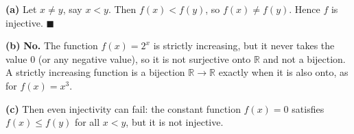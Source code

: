 \textbf{(a)} Let $x\ne y$, say $x<y$. Then $f(x)<f(y)$, so $f(x)\ne f(y)$. Hence $f$ is injective. $\blacksquare$

\textbf{(b)} \textbf{No.} The function $f(x)=2^x$ is strictly increasing, but it never takes the value $0$ (or any negative value), so it is not surjective onto $\mathbb R$ and not a bijection. A strictly increasing function is a bijection $\mathbb R\to\mathbb R$ exactly when it is also onto, as for $f(x)=x^3$.

\textbf{(c)} Then even injectivity can fail: the constant function $f(x)=0$ satisfies $f(x)\le f(y)$ for all $x<y$, but it is not injective.
